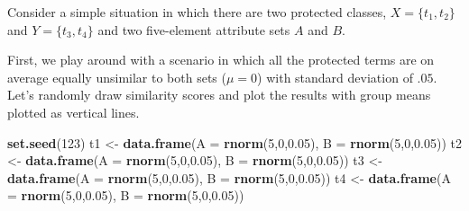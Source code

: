 \documentclass[10pt,dvipsnames,enabledeprecatedfontcommands]{scrartcl}
\newenvironment{Shaded}{\begin{snugshade}}{\end{snugshade}}
\newcommand{\KeywordTok}[1]{\textcolor[rgb]{0.13,0.29,0.53}{\textbf{#1}}}
\newcommand{\DataTypeTok}[1]{\textcolor[rgb]{0.13,0.29,0.53}{#1}}
\newcommand{\DecValTok}[1]{\textcolor[rgb]{0.00,0.00,0.81}{#1}}
\newcommand{\FloatTok}[1]{\textcolor[rgb]{0.00,0.00,0.81}{#1}}
\newcommand{\StringTok}[1]{\textcolor[rgb]{0.31,0.60,0.02}{#1}}
\newcommand{\NormalTok}[1]{#1}
\begin{document}
Consider a simple situation in which there are two protected classes,
\(X=\{t_1,t_2\}\) and \(Y=\{t_3,t_4\}\) and two five-element attribute
sets \(A\) and \(B\).

First, we play around with a scenario in which all the protected terms
are on average equally unsimilar to both sets (\(\mu =0\)) with standard
deviation of \(.05\). Let's randomly draw similarity scores and plot the
results with group means plotted as vertical lines.

\footnotesize

\begin{Shaded}
\begin{Highlighting}[]
\KeywordTok{set.seed}\NormalTok{(}\DecValTok{123}\NormalTok{)}
\NormalTok{t1 <-}\StringTok{ }\KeywordTok{data.frame}\NormalTok{(}\DataTypeTok{A  =} \KeywordTok{rnorm}\NormalTok{(}\DecValTok{5}\NormalTok{,}\DecValTok{0}\NormalTok{,}\FloatTok{0.05}\NormalTok{), }\DataTypeTok{B =} \KeywordTok{rnorm}\NormalTok{(}\DecValTok{5}\NormalTok{,}\DecValTok{0}\NormalTok{,}\FloatTok{0.05}\NormalTok{))}
\NormalTok{t2 <-}\StringTok{ }\KeywordTok{data.frame}\NormalTok{(}\DataTypeTok{A  =} \KeywordTok{rnorm}\NormalTok{(}\DecValTok{5}\NormalTok{,}\DecValTok{0}\NormalTok{,}\FloatTok{0.05}\NormalTok{), }\DataTypeTok{B =} \KeywordTok{rnorm}\NormalTok{(}\DecValTok{5}\NormalTok{,}\DecValTok{0}\NormalTok{,}\FloatTok{0.05}\NormalTok{))}
\NormalTok{t3 <-}\StringTok{ }\KeywordTok{data.frame}\NormalTok{(}\DataTypeTok{A  =} \KeywordTok{rnorm}\NormalTok{(}\DecValTok{5}\NormalTok{,}\DecValTok{0}\NormalTok{,}\FloatTok{0.05}\NormalTok{), }\DataTypeTok{B =} \KeywordTok{rnorm}\NormalTok{(}\DecValTok{5}\NormalTok{,}\DecValTok{0}\NormalTok{,}\FloatTok{0.05}\NormalTok{))}
\NormalTok{t4 <-}\StringTok{ }\KeywordTok{data.frame}\NormalTok{(}\DataTypeTok{A  =} \KeywordTok{rnorm}\NormalTok{(}\DecValTok{5}\NormalTok{,}\DecValTok{0}\NormalTok{,}\FloatTok{0.05}\NormalTok{), }\DataTypeTok{B =} \KeywordTok{rnorm}\NormalTok{(}\DecValTok{5}\NormalTok{,}\DecValTok{0}\NormalTok{,}\FloatTok{0.05}\NormalTok{))}
\end{Highlighting}
\end{Shaded}

\normalsize
\end{document}
